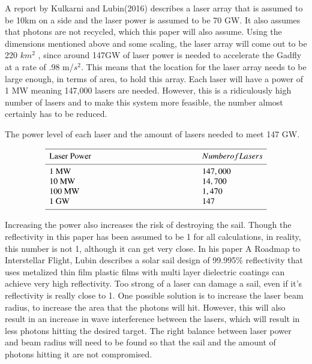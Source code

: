 \documentclass{aa}
\begin{document}
A report by Kulkarni and Lubin(2016) describes a laser array that is assumed to be 10km on a side and the laser power is assumed to be 70 GW. It also assumes that photons are not recycled, which this paper will also assume. Using the dimensions mentioned above and some scaling, the laser array will come out to be 220 $km^2$ , since around 147GW of laser power is needed to accelerate the Gadfly at a rate of .98 m/$s^2$. This means that the location for the laser array needs to be large enough, in terms of area, to hold this array. Each laser will have a power of 1 MW meaning 147,000 lasers are needed. However, this is a ridiculously high number of lasers and to make this system more feasible, the number almost certainly has to be reduced. 
\begin{table}[h!]
          \caption[]{The power level of each laser and the amount of lasers needed to meet 147 GW.}
         \label{KapSou}
     $$ 
         \begin{array}{p{0.5\linewidth}l}
            \hline
            \noalign{\smallskip}
            Laser Power     &  Number  of Lasers\\
            \noalign{\smallskip}
            \hline
            \noalign{\smallskip}
            1 MW   & 147,000           \\
            10 MW  & 14,700         \\
            100 MW & 1,470     \\
            1 GW   & 147                   \\
            \noalign{\smallskip}
            \hline
         \end{array}
     $$ 
   \end{table}
Increasing the power also increases the risk of destroying the sail. Though the reflectivity in this paper has been assumed to be 1 for all calculations, in reality, this number is not 1, although it can get very close. In his paper A Roadmap to Interstellar Flight, Lubin describes a solar sail design of 99.995\% reflectivity that uses metalized thin film plastic films with multi layer dielectric coatings can achieve very high reflectivity. Too strong of a laser can damage a sail, even if it's reflectivity is really close to 1. One possible solution is to increase the laser beam radius, to increase the area that the photons will hit. However, this will also result in an increase in wave interference between the lasers, which will result in less photons hitting the desired target. The right balance between laser power and beam radius will need to be found so that the sail and the amount of photons hitting it are not compromised.
\end{document}

